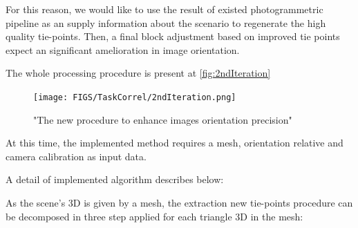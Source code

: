 For this reason, we would like to use the result of existed photogrammetric pipeline as an supply information about the scenario to regenerate the high quality tie-points. Then, a final block adjustment based on improved tie points expect an significant amelioration in image orientation.
\newline


The whole processing procedure is present at \autoref{fig:2ndIteration}

\begin{figure}
\begin{center}
\texttt{[image: FIGS/TaskCorrel/2ndIteration.png]}
\caption{"The new procedure to enhance images orientation precision"}
\label{fig:2ndIteration}
\end{center}
\end{figure}



At this time, the implemented method requires a mesh, orientation relative and camera calibration as input data. 

A detail of implemented algorithm describes below:


As the scene’s 3D is given by a mesh, the extraction new tie-points procedure can be decomposed in three step applied for each triangle 3D in the mesh:

